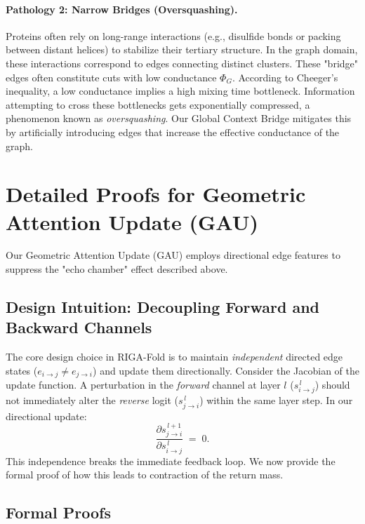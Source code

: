 \documentclass{article}
\theoremstyle{plain}
\theoremstyle{definition}
\theoremstyle{remark}
\begin{document}
{\paragraph{Pathology 2: Narrow Bridges (Oversquashing).}
Proteins often rely on long-range interactions (e.g., disulfide bonds or packing between distant helices) to stabilize their tertiary structure. In the graph domain, these interactions correspond to edges connecting distinct clusters. These "bridge" edges often constitute cuts with low conductance $\Phi_G$.
According to Cheeger's inequality, a low conductance implies a high mixing time bottleneck. Information attempting to cross these bottlenecks gets exponentially compressed, a phenomenon known as \textit{oversquashing}. Our Global Context Bridge mitigates this by artificially introducing edges that increase the effective conductance of the graph.

\section{Detailed Proofs for Geometric Attention Update (GAU)}
\label{sec:proof_edge}

Our Geometric Attention Update (GAU) employs directional edge features to suppress the "echo chamber" effect described above.

\subsection{Design Intuition: Decoupling Forward and Backward Channels}
The core design choice in RIGA-Fold is to maintain \emph{independent} directed edge states ($e_{i\to j} \neq e_{j\to i}$) and update them directionally.
Consider the Jacobian of the update function. A perturbation in the \emph{forward} channel at layer $l$ ($s_{i\to j}^{\,l}$) should not immediately alter the \emph{reverse} logit ($s_{j\to i}^{\,l}$) within the same layer step. In our directional update:
\begin{equation}\label{eq:zero-cross}
\frac{\partial s_{j\to i}^{\,l+1}}{\partial s_{i\to j}^{\,l}} \;=\; 0.
\end{equation}
This independence breaks the immediate feedback loop. We now provide the formal proof of how this leads to contraction of the return mass.

\subsection{Formal Proofs}

}
\end{document}
